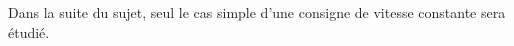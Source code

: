 Dans la suite du sujet, seul le cas simple d'une consigne de vitesse constante sera étudié.
%
%
%
%
%
%
%
%
%
%
%
%
%
%
%
%
%
